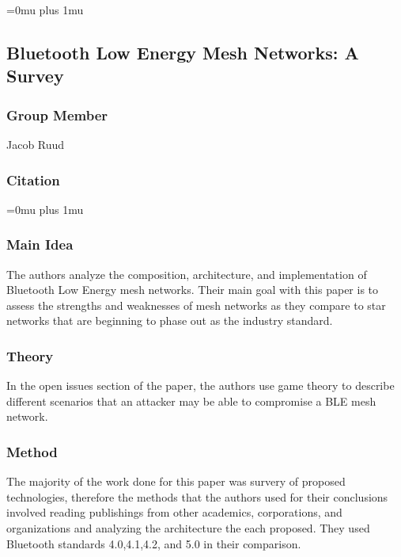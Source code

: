 \Urlmuskip=0mu plus 1mu\relax

\subsection{Bluetooth Low Energy Mesh Networks: A Survey}

\subsubsection{Group Member}

\noindent
Jacob Ruud
\noindent
\subsubsection{Citation}

\Urlmuskip=0mu plus 1mu\relax

\subsubsection{Main Idea}

\noindent
The authors analyze the composition, architecture, and implementation of Bluetooth Low Energy mesh networks. Their main goal with this paper is to assess the strengths and weaknesses of mesh networks as they compare to star networks that are beginning to phase out as the industry standard.

\subsubsection{Theory}

\noindent

In the open issues section of the paper, the authors use game theory to describe different scenarios that an attacker may be able to compromise a BLE mesh network.

\subsubsection{Method}

\noindent
The majority of the work done for this paper was survery of proposed technologies, therefore the methods that the authors used for their conclusions involved reading publishings from other academics, corporations, and organizations and analyzing the architecture the each proposed. They used Bluetooth standards 4.0,4.1,4.2, and 5.0 in their comparison.

